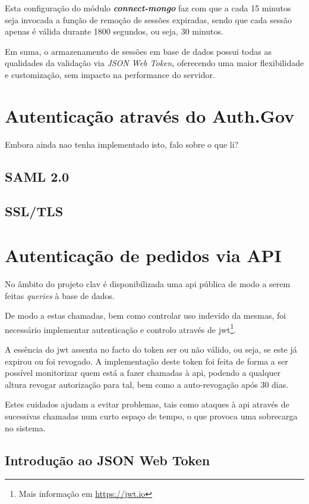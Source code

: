 Esta configuração do módulo \emph{\textbf{connect-mongo}} faz com que a cada 15 minutos seja invocada a função de remoção de sessões expiradas, sendo que cada sessão apenas é válida durante 1800 segundos, ou seja, 30 minutos.

Em suma, o armazenamento de sessões em base de dados possui todas as qualidades da validação via \emph{JSON Web Token}, oferecendo uma maior flexibilidade e customização, sem impacto na performance do servidor.

\cleardoublepage
\section{Autenticação através do Auth.Gov}

Embora ainda nao tenha implementado isto, falo sobre o que li?

\subsection{SAML 2.0}
\subsection{SSL/TLS}

\cleardoublepage
\section{Autenticação de pedidos via API}

No âmbito do projeto \gls{clav} é disponibilizada uma \gls{api} pública de modo a serem feitas \emph{queries} à base de dados.

De modo a estas chamadas, bem como controlar uso indevido da mesmas, foi necessário implementar autenticação e controlo através de \gls{jwt}\footnote{Mais informação em \url{https://jwt.io}}.

A essência do \gls{jwt} assenta no facto do token ser ou não válido, ou seja, se este já expirou ou foi revogado. A implementação deste token foi feita de forma a ser possível monitorizar quem está a fazer chamadas à \gls{api}, podendo a qualquer altura revogar autorização para tal, bem como a auto-revogação após 30 dias.

Estes cuidados ajudam a evitar problemas, tais como ataques à \gls{api} através de sucessivas chamadas num curto espaço de tempo, o que provoca uma sobrecarga no sistema.

\subsection{Introdução ao JSON Web Token}


